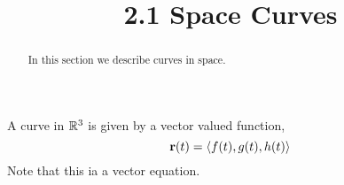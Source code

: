 \documentclass[handout]{ximera}
\title{2.1 Space Curves}
\begin{document}
\begin{abstract}
In this section we describe curves in space.
\end{abstract}

\maketitle





A curve in $\mathbb R^3$ is given by a vector valued function,
\[
\mathbf r(t) = \left\langle f(t), g(t), h(t)\right\rangle
\]
Note that this ia a vector equation.
\end{document}

